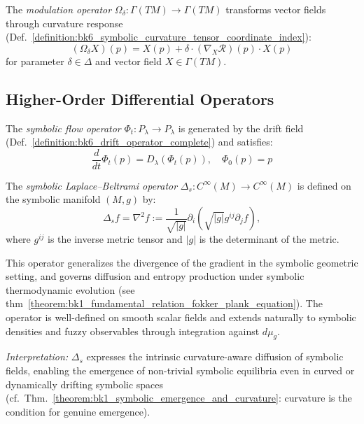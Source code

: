 \begin{definition}
\label{definition:bk6_modulation_operator_complete}
The \emph{modulation operator} $\Omega_\delta : \Gamma(TM) \to \Gamma(TM)$ transforms vector fields through curvature response (Def.~\ref{definition:bk6_symbolic_curvature_tensor_coordinate_index}):
\begin{equation}
(\Omega_\delta X)(p) = X(p) + \delta \cdot (\nabla_X \mathcal{R})(p) \cdot X(p)
\end{equation}
for parameter $\delta \in \Delta$ and vector field $X \in \Gamma(TM)$.
\end{definition}

\subsection{Higher-Order Differential Operators}
\label{subsec:bk6_higher_order_differential_operators}

\begin{definition}
\label{definition:bk6_symbolic_flow_operator_complete}
The \emph{symbolic flow operator} $\Phi_t : P_\lambda \to P_\lambda$ is generated by the drift field (Def.~\ref{definition:bk6_drift_operator_complete}) and satisfies:
\begin{equation}
\frac{d}{dt}\Phi_t(p) = D_\lambda(\Phi_t(p)), \quad \Phi_0(p) = p
\end{equation}
\end{definition}

\begin{definition}
\label{definition:bk6_symbolic_laplace_beltrami_operator_complete}
The \emph{symbolic Laplace–Beltrami operator} $\Delta_s : C^\infty(M) \to C^\infty(M)$ is defined on the symbolic manifold $(M, g)$ by:
\[
\Delta_s f = \nabla^2 f := \frac{1}{\sqrt{|g|}} \partial_i \left( \sqrt{|g|} g^{ij} \partial_j f \right),
\]
where $g^{ij}$ is the inverse metric tensor and $|g|$ is the determinant of the metric.

This operator generalizes the divergence of the gradient in the symbolic geometric setting, and governs diffusion and entropy production under symbolic thermodynamic evolution (see thm~\ref{theorem:bk1_fundamental_relation_fokker_plank_equation}). The operator is well-defined on smooth scalar fields and extends naturally to symbolic densities and fuzzy observables through integration against $d\mu_g$.

\emph{Interpretation:} $\Delta_s$ expresses the intrinsic curvature-aware diffusion of symbolic fields, enabling the emergence of non-trivial symbolic equilibria even in curved or dynamically drifting symbolic spaces (cf.~Thm.~\ref{theorem:bk1_symbolic_emergence_and_curvature}: curvature is the condition for genuine emergence).
\end{definition}

